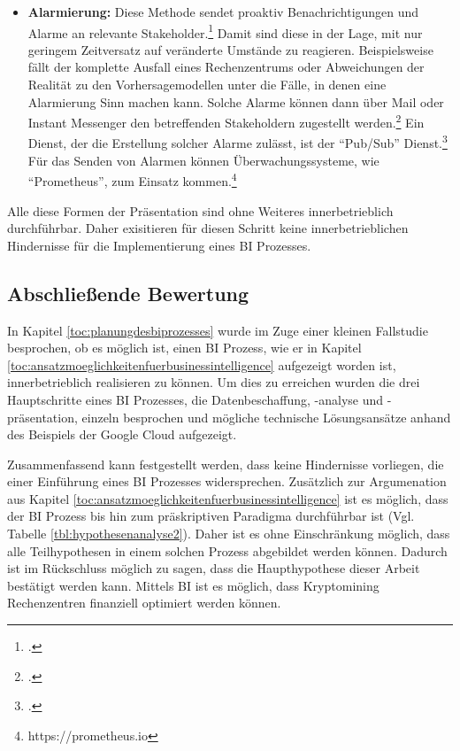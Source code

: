 \begin{itemize}
    technischen \acp{KPI}, wie beispielsweise der Darstellung von Hashrates oder Stromverbrauch der Hardware, findet diese
    Form der Visualisierung Anwendung. Desweiteren sind die Stakeholder in der Lage, ihre eigenen Dashboards zu erstellen.\footcite[Vgl.][S. 314f]{loshin2012business}
    Eine gängige Anwendung zur Erstellung von Dashboards ist "`Grafana"'.\footnote{https://grafana.com}
    \item \textbf{Alarmierung: }Diese Methode sendet proaktiv Benachrichtigungen und Alarme an
    relevante Stakeholder.\footcite[Vgl.][S. 311f]{loshin2012business} Damit sind diese in der Lage, mit nur geringem Zeitversatz auf veränderte Umstände zu reagieren. Beispielsweise
    fällt der komplette Ausfall eines Rechenzentrums oder Abweichungen der Realität zu den Vorhersagemodellen unter die Fälle, in denen
    eine Alarmierung Sinn machen kann. Solche Alarme können dann über Mail oder Instant Messenger den betreffenden Stakeholdern zugestellt
    werden.\footcite[Vgl.][S. 311f]{loshin2012business} Ein Dienst, der die Erstellung solcher Alarme zulässt, ist der "`Pub/Sub"' Dienst.\footcite[Vgl.][]{googlecloud2021dw} Für das Senden von Alarmen
    können Überwachungssysteme, wie "`Prometheus"', zum Einsatz kommen.\footnote{https://prometheus.io}
\end{itemize}

Alle diese Formen der Präsentation sind ohne Weiteres innerbetrieblich durchführbar. Daher exisitieren für diesen Schritt keine innerbetrieblichen
Hindernisse für die Implementierung eines \ac{BI} Prozesses.

\subsection{Abschließende Bewertung} \label{toc:abschliessendebewertung}

In Kapitel \ref{toc:planungdesbiprozesses} wurde im Zuge einer kleinen Fallstudie besprochen, ob es möglich ist, einen \ac{BI} Prozess,
wie er in Kapitel \ref{toc:ansatzmoeglichkeitenfuerbusinessintelligence} aufgezeigt worden ist, innerbetrieblich realisieren zu können.
Um dies zu erreichen wurden die drei Hauptschritte eines \ac{BI} Prozesses, die Datenbeschaffung, -analyse und -präsentation, einzeln
besprochen und mögliche technische Lösungsansätze anhand des Beispiels der Google Cloud aufgezeigt.

Zusammenfassend kann festgestellt werden, dass keine Hindernisse vorliegen, die einer Einführung eines \ac{BI} Prozesses widersprechen.
Zusätzlich zur Argumenation aus Kapitel \ref{toc:ansatzmoeglichkeitenfuerbusinessintelligence} ist es möglich, dass der \ac{BI} Prozess
bis hin zum präskriptiven Paradigma durchführbar ist (Vgl. Tabelle \ref{tbl:hypothesenanalyse2}). Daher ist es ohne Einschränkung möglich, dass alle Teilhypothesen in einem
solchen Prozess abgebildet werden können. Dadurch ist im Rückschluss möglich zu sagen, dass die Haupthypothese dieser Arbeit bestätigt werden
kann. Mittels \ac{BI} ist es möglich, dass Kryptomining Rechenzentren finanziell optimiert werden können.

